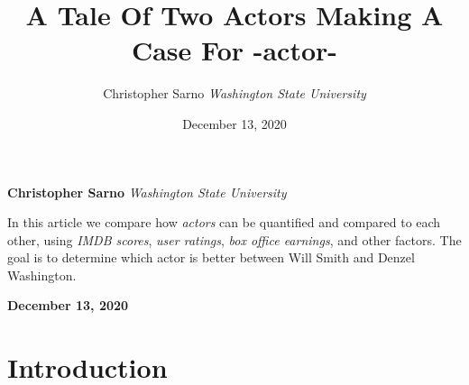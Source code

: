 \documentclass[]{article}
\title{\textbf{\textcolor{WSU.crimson}{A Tale Of Two
Actors}} \newline \textbf{\textcolor{WSU.gray}{Making A Case For
-actor-}}  }
\author{\Large Christopher
Sarno\vspace{0.05in} \newline\normalsize\emph{Washington State
University}  }
\date{December 13, 2020}
\newcommand*{\authorfont}{\fontfamily{phv}\selectfont}
\renewenvironment{abstract}
 {{%
    \setlength{\leftmargin}{0mm}
    \setlength{\rightmargin}{\leftmargin}%
  }%
  \relax}
 {\endlist}
\begin{document}
	
%    


{%
\setlength{\parindent}{0pt}
\thispagestyle{plain}
{\fontsize{18}{20}\selectfont\raggedright 
\maketitle  %

}

{
   \vskip 13.5pt\relax \normalsize\fontsize{11}{12} 
   
\textbf{\authorfont Christopher
Sarno} \hskip 15pt \emph{\small Washington State University}   

}

}








\begin{abstract}

    \hbox{\vrule height .2pt width 39.14pc}

    \vskip 8.5pt %

\noindent In this article we compare how \emph{actors} can be quantified
and compared to each other, using \emph{IMDB scores},
\emph{user ratings}, \emph{box office earnings}, and other factors. The
goal is to determine which actor is better between Will Smith and Denzel
Washington. \vspace{0.25in}


    



    
    \hbox{\vrule height .2pt width 39.14pc}
    \vskip 5pt 
    \hfill \textbf{\textcolor{WSU.gray}{ December 13, 2020 } }
    \vskip 5pt 
    
\end{abstract}


\vskip -8.5pt




\noindent  

\section{Introduction}
\label{sec:intro}
\end{document}
